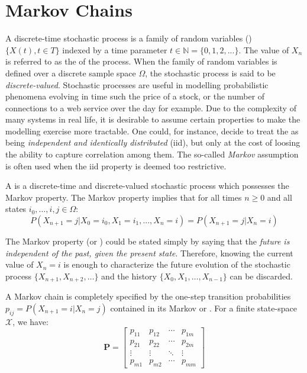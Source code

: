 \section{Markov Chains}

A discrete-time stochastic process is a family of random variables (\rvs)  $\{ X(t), t \in T\}$
indexed by a time parameter $t \in \mathbb{N} = \{0, 1, 2,...\}$. The
value of $X_n$ is referred to as the  of the process. When the family of
random variables is defined over a discrete sample space
$\Omega$, the stochastic process is said to be \textit{discrete-valued}.
Stochastic processes are useful in modelling probabilistic phenomena evolving in
time such the price of a stock, or the
number of connections to a web service over the day for example. Due to the
complexity of many systems in real life, it is desirable to assume certain properties to make the modelling exercise more tractable. One could, for instance, decide to treat the \rvs as being
\textit{independent and identically distributed} (iid), but only at the cost of loosing the ability to
capture correlation among them. The so-called \textit{Markov}
assumption is often used when the iid property is deemed too restrictive.

\begin{defn}
A  is a discrete-time and discrete-valued stochastic process
which possesses the Markov property. The Markov property implies that for all times $n \geq
0$ and all states $i_0, \dots, i, j \in \Omega$:
\begin{equation}
P(X_{n+1} = j | X_0 = i_0, X_1 = i_1, ..., X_n = i) = P( X_{n+1} = j | X_n = i)
\end{equation}
\end{defn}

The Markov property (or ) could be stated simply by
saying that the \textit{future is independent of the past, given the present state}.
Therefore, knowing the current value of $X_n = i$ is enough to characterize the
future evolution of the stochastic process $\{X_{n+1}, X_{n+2}, \dots \}$ and the history
$\{X_0, X_1,\dots, X_{n-1} \}$ can be discarded.

A Markov chain is completely specified by the one-step transition probabilities
$p_{ij} = P(X_{n+1} = i | X_n = j)$ contained in its Markov or
. For a finite state-space $\mathcal{X}$, we have:
\begin{equation}
\mathbf{P} = \begin{bmatrix}
p_{11} & p_{12} & \cdots & p_{1m} \\
p_{21} & p_{22} & \cdots & p_{2m} \\
\vdots & \vdots & \ddots & \vdots \\
p_{m1} & p_{m2} & \cdots & p_{mm}
\end{bmatrix}
\end{equation}

